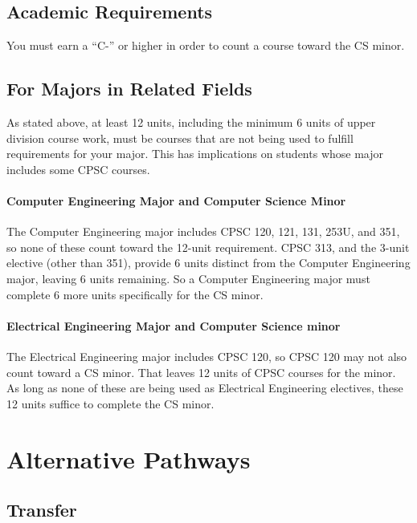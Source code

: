 \documentclass{book}
\begin{document}
\section{Academic Requirements}

You must earn a ``C-'' or higher in order to count a course toward the CS minor.

\section{For Majors in Related Fields}

As stated above, at least 12 units, including the minimum 6 units of upper division course work, must be courses that are not being used to fulfill requirements for your major. This has implications on students whose major includes some CPSC courses.

\subsubsection{Computer Engineering Major and Computer Science Minor}

The Computer Engineering major includes CPSC 120, 121, 131, 253U, and 351, so none of these count toward the 12-unit requirement. CPSC 313, and the 3-unit elective (other than 351), provide 6 units distinct from the Computer Engineering major, leaving 6 units remaining. So a Computer Engineering major must complete 6 more units specifically for the CS minor.

\subsubsection{Electrical Engineering Major and Computer Science minor}

The Electrical Engineering major includes CPSC 120, so CPSC 120 may not also count toward a CS minor. That leaves 12 units of CPSC courses for the minor. As long as none of these are being used as Electrical Engineering electives, these 12 units suffice to complete the CS minor.

\chapter{Alternative Pathways}

\section{Transfer}
\end{document}
